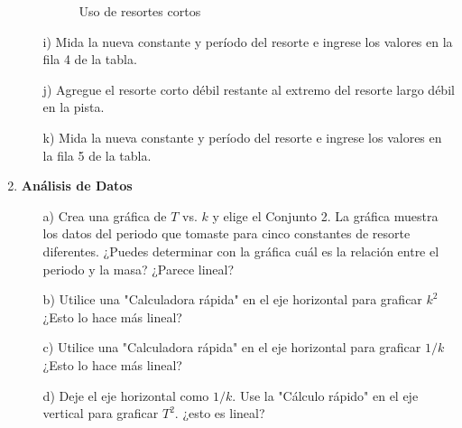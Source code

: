 \documentclass[9pt,a4paper,twocolumn,twoside]{tau-class/tau}
\begin{document}
\begin{enumerate}
\begin{itemize}
\begin{figure}[htbp]
                \caption{Uso  de  resortes  cortos}
                \label{fig:06}
            \end{figure}
            \item[i)]   Mida  la  nueva  constante  y  período  del  resorte  e  ingrese  los  valores  en  la  fila  4  de  la  tabla.
            \item[j)]   Agregue  el  resorte  corto  débil  restante  al  extremo  del  resorte  largo  débil  en  la  pista.
            \item[k)]   Mida  la  nueva  constante  y  período  del  resorte  e  ingrese  los  valores  en  la  fila  5  de  la  tabla.
        \end{itemize}
    \item \textbf{Análisis de Datos}
        \begin{itemize}
            \item [a)]   Crea  una  gráfica  de  $T$  vs.  $k$  y  elige  el  Conjunto  2.  La  gráfica  muestra  los  datos  del  periodo  que  tomaste  para  cinco  constantes  de  resorte  diferentes.  ¿Puedes  determinar  con  la  gráfica  cuál  es  la  relación  entre  el  periodo  y  la  masa?  ¿Parece  lineal?
            \item [b)] Utilice  una  "Calculadora  rápida"  en  el  eje  horizontal  para  graficar  $k^2$ ¿Esto  lo  hace  más  lineal?
            \item [c)]  Utilice  una  "Calculadora  rápida"  en  el  eje  horizontal  para  graficar  $1/k$ ¿Esto  lo  hace  más  lineal?
            \item [d)]   Deje  el  eje  horizontal  como  $1/k$.  Use  la  "Cálculo  rápido"  en  el  eje  vertical  para  graficar  $T^2$. ¿esto  es  lineal?
        \end{itemize}
\end{enumerate}
\end{document}
